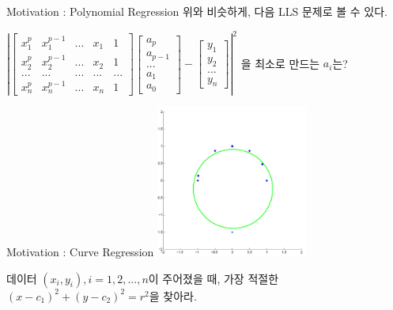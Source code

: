 \documentclass{beamer}
\begin{document}
\begin{frame}{Motivation : Polynomial Regression} 
위와 비슷하게, 다음 LLS 문제로 볼 수 있다. 
\vspace{5mm}

$ \left| \left[ \begin{matrix} 
x_1^p & x_1^{p-1} & ... & x_1 & 1 \\  
x_2^p & x_2^{p-1} & ... & x_2 & 1 \\
... & ... & ... & ... & ... \\
x_n^p & x_n^{p-1} & ... & x_n & 1 
\end{matrix} \right] \left[ \begin{matrix} 
a_p \\
a_{p-1} \\
... \\ 
a_1 \\
a_0 \end{matrix} \right] - \left[ \begin{matrix}
y_1 \\
y_2 \\ 
... \\ 
y_n \end{matrix} \right] \right|^2 
$ 을 최소로 만드는 $a_i$는?

\end{frame}

\begin{frame}{Motivation : Curve Regression} 
\includegraphics[height=5cm,keepaspectratio]{circle}

데이터 $(x_i, y_i), i=1,2,...,n$이 주어졌을 때, 가장 적절한 $(x-c_1)^2 + (y-c_2)^2 = r^2$을 찾아라. 
\end{frame}
\end{document}
